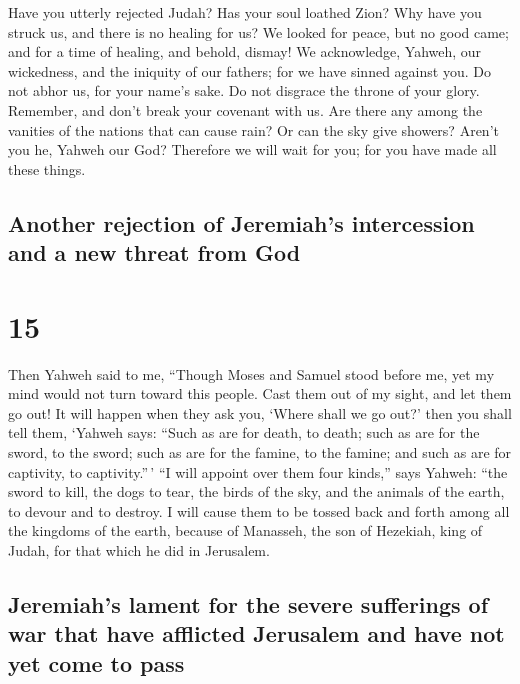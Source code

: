  Have you utterly rejected Judah? Has your soul loathed
Zion? Why have you struck us, and there is no healing for us? We looked
for peace, but no good came; and for a time of healing, and behold,
dismay!  We acknowledge, Yahweh, our wickedness, and the
iniquity of our fathers; for we have sinned against you. 
Do not abhor us, for your name's sake. Do not disgrace the throne of
your glory. Remember, and don't break your covenant with us.
 Are there any among the vanities of the nations that can
cause rain? Or can the sky give showers? Aren't you he, Yahweh our God?
Therefore we will wait for you; for you have made all these things.

\hypertarget{another-rejection-of-jeremiahs-intercession-and-a-new-threat-from-god}{%
\subsection{Another rejection of Jeremiah's intercession and a new
threat from
God}\label{another-rejection-of-jeremiahs-intercession-and-a-new-threat-from-god}}

\hypertarget{section-14}{%
\section{15}\label{section-14}}

 Then Yahweh said to me, ``Though Moses and Samuel stood
before me, yet my mind would not turn toward this people. Cast them out
of my sight, and let them go out!  It will happen when
they ask you, `Where shall we go out?' then you shall tell them, `Yahweh
says: ``Such as are for death, to death; such as are for the sword, to
the sword; such as are for the famine, to the famine; and such as are
for captivity, to captivity.''\,'  ``I will appoint over
them four kinds,'' says Yahweh: ``the sword to kill, the dogs to tear,
the birds of the sky, and the animals of the earth, to devour and to
destroy.  I will cause them to be tossed back and forth
among all the kingdoms of the earth, because of Manasseh, the son of
Hezekiah, king of Judah, for that which he did in Jerusalem.

\hypertarget{jeremiahs-lament-for-the-severe-sufferings-of-war-that-have-afflicted-jerusalem-and-have-not-yet-come-to-pass}{%
\subsection{Jeremiah's lament for the severe sufferings of war that have
afflicted Jerusalem and have not yet come to
pass}\label{jeremiahs-lament-for-the-severe-sufferings-of-war-that-have-afflicted-jerusalem-and-have-not-yet-come-to-pass}}

